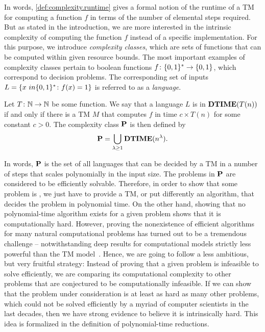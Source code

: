 In words, \cref{def:complexity.runtime} gives a formal notion of the runtime of a TM for computing a function $f$ in terms of the number of elemental steps required.
But as stated in the introduction, we are more interested in the intrinsic complexity of computing the function $f$ instead of a specific implementation.
For this purpose, we introduce \emph{complexity classes}, which are sets of functions that can be computed within given resource bounds.
The most important examples of complexity classes pertain to boolean functions $f\colon \BitStrings \to \{0, 1\}$, which correspond to decision problems.
The corresponding set of  inputs $L = \{x \ in \BitStrings\colon f(x) = 1\}$ is referred to as a \emph{language}.
\begin{definition}%
  \label{def:complexity.p}
  Let $T\colon \Naturals \to \Naturals$ be some function.
  We say that a language $L$ is in $\DTIME(T(n))$ if and only if there is a TM $M$ that computes $f$ in time $c \times T(n)$ for some constant $c > 0$.
  The complexity class $\P$ is then defined by
  \[
    \P = \bigcup_{\lambda \ge 1} \DTIME(n^\lambda).
  \]
\end{definition}
In words, $\P$ is the set of all languages that can be decided by a TM in a number of steps that scales polynomially in the input size.
The problems in $\P$ are considered to be efficiently solvable.
Therefore, in order to show that some problem is , we just have to provide a TM, or put differently an algorithm, that decides the problem in polynomial time.
On the other hand, showing that no polynomial-time algorithm exists for a given problem shows that it is computationally hard.
However, proving the nonexistence of efficient algorithms for many natural computational problems has turned out to be a tremendous challenge -- notwithstanding deep results for computational models strictly less powerful than the TM model~\cite[Part Two]{Arora_2009_Computational}.
Hence, we are going to follow a less ambitious, but very fruitful strategy:
Instead of proving that a given problem is infeasible to solve efficiently, we are comparing its computational complexity to other problems that are conjectured to be computationally infeasible.
If we can show that the problem under consideration is at least as hard as many other problems, which could not be solved efficiently by a myriad of computer scientists in the last decades, then we have strong evidence to believe it is intrinsically hard.
This idea is formalized in the definition of polynomial-time reductions.

